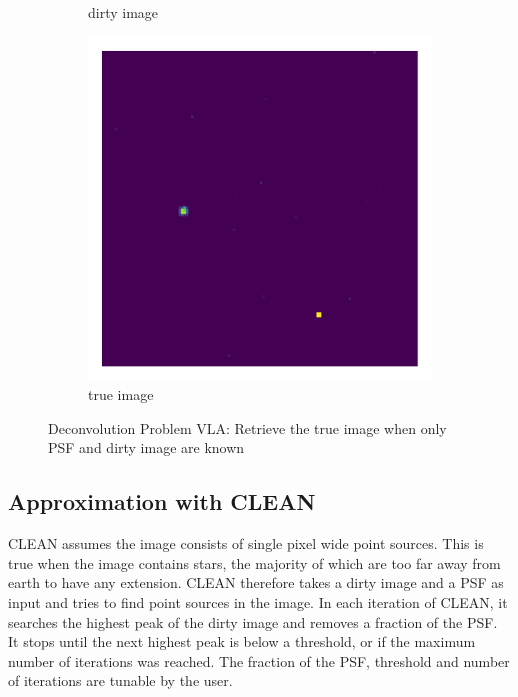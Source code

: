 \begin{figure}[h!]
\begin{subfigure}[b]{0.28\linewidth}
		\caption{dirty image}
	\end{subfigure}
	\begin{subfigure}[b]{0.28\linewidth}
		\includegraphics[width=\linewidth, trim={18px 19px 18px 18px}, clip]{./chapters/01.intro/img/true_image.png}
		\caption{true image}
	\end{subfigure}
	\caption{Deconvolution Problem VLA: Retrieve the true image when only PSF and dirty image are known}
	\label{intro:measurement_problem}
\end{figure}

\subsection{Approximation with CLEAN}
CLEAN assumes the image consists of single pixel wide point sources. This is true when the image contains stars, the majority of which are too far away from earth to have any extension. CLEAN therefore takes a dirty image and a PSF as input and tries to find point sources in the image. In each iteration of CLEAN, it searches the highest peak of the dirty image and removes a fraction of the PSF. It stops until the next highest peak is below a threshold, or if the maximum number of iterations was reached. The fraction of the PSF, threshold and number of iterations are tunable by the user.

